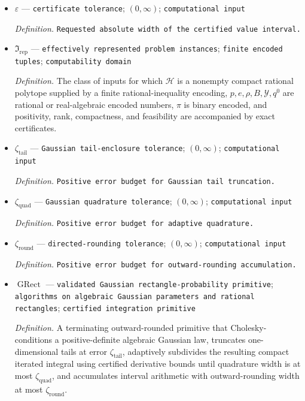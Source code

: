 \documentclass{article}
\begin{document}
\begin{itemize}
  \par\smallskip\noindent\emph{Definition.} \(\widetilde\theta_n=A_{\mathrm{map}}\widetilde\beta_n\).
  \item \(\varepsilon\) --- \texttt{certificate tolerance}; \((0,\infty)\); \texttt{computational input}
  \par\smallskip\noindent\emph{Definition.} \texttt{Requested absolute width of the certified value interval.}
  \item \(\mathfrak I_{\mathrm{rep}}\) --- \texttt{effectively represented problem instances}; \texttt{finite encoded tuples}; \texttt{computability domain}
  \par\smallskip\noindent\emph{Definition.} The class of inputs for which \(\mathcal H\) is a nonempty compact rational polytope supplied by a finite rational-inequality encoding, \(p,e,\rho,B,\mathcal Y,q^0\) are rational or real-algebraic encoded numbers, \(\pi\) is binary encoded, and positivity, rank, compactness, and feasibility are accompanied by exact certificates.
  \item \(\zeta_{\mathrm{tail}}\) --- \texttt{Gaussian tail-\allowbreak{}enclosure tolerance}; \((0,\infty)\); \texttt{computational input}
  \par\smallskip\noindent\emph{Definition.} \texttt{Positive error budget for Gaussian tail truncation.}
  \item \(\zeta_{\mathrm{quad}}\) --- \texttt{Gaussian quadrature tolerance}; \((0,\infty)\); \texttt{computational input}
  \par\smallskip\noindent\emph{Definition.} \texttt{Positive error budget for adaptive quadrature.}
  \item \(\zeta_{\mathrm{round}}\) --- \texttt{directed-\allowbreak{}rounding tolerance}; \((0,\infty)\); \texttt{computational input}
  \par\smallskip\noindent\emph{Definition.} \texttt{Positive error budget for outward-\allowbreak{}rounding accumulation.}
  \item \(\operatorname{GRect}\) --- \texttt{validated Gaussian rectangle-\allowbreak{}probability primitive}; \texttt{algorithms on algebraic Gaussian parameters and rational rectangles}; \texttt{certified integration primitive}
  \par\smallskip\noindent\emph{Definition.} A terminating outward-rounded primitive that Cholesky-conditions a positive-definite algebraic Gaussian law, truncates one-dimensional tails at error \(\zeta_{\mathrm{tail}}\), adaptively subdivides the resulting compact iterated integral using certified derivative bounds until quadrature width is at most \(\zeta_{\mathrm{quad}}\), and accumulates interval arithmetic with outward-rounding width at most \(\zeta_{\mathrm{round}}\).

\end{itemize}
\end{document}
